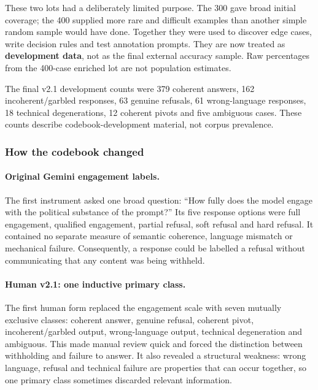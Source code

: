 These two lots had a deliberately limited purpose. The 300 gave broad initial
coverage; the 400 supplied more rare and difficult examples than another
simple random sample would have done. Together they were used to discover
edge cases, write decision rules and test annotation prompts. They are now
treated as \textbf{development data}, not as the final external accuracy
sample. Raw percentages from the 400-case enriched lot are not population
estimates.

The final v2.1 development counts were 379 coherent answers, 162
incoherent/garbled responses, 63 genuine refusals, 61 wrong-language responses,
18 technical degenerations, 12 coherent pivots and five ambiguous cases. These
counts describe codebook-development material, not corpus prevalence.


\subsubsection{How the codebook changed}

\paragraph{Original Gemini engagement labels.}
The first instrument asked one broad question: ``How fully does the model
engage with the political substance of the prompt?'' Its five response options
were full engagement, qualified engagement, partial refusal, soft refusal and
hard refusal. It contained no separate measure of semantic coherence,
language mismatch or mechanical failure. Consequently, a response could be
labelled a refusal without communicating that any content was being withheld.

\paragraph{Human v2.1: one inductive primary class.}
The first human form replaced the engagement scale with seven mutually
exclusive classes: coherent answer, genuine refusal, coherent pivot,
incoherent/garbled output, wrong-language output, technical degeneration and
ambiguous. This made manual review quick and forced the distinction between
withholding and failure to answer. It also revealed a structural weakness:
wrong language, refusal and technical failure are properties that can occur
together, so one primary class sometimes discarded relevant information.

